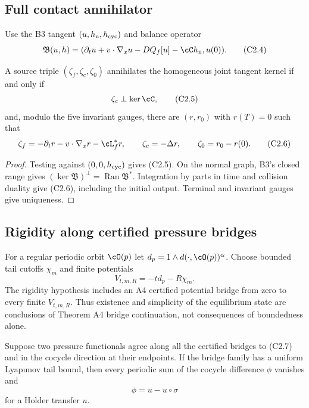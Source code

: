 \subsection{Full contact annihilator}

Use the B3 tangent $(u,h_{\rm n},h_{\rm cyc})$ and balance operator
\[
 \mathfrak B(u,h)=
 (\partial_tu+v\cdot\nabla_xu-DQ_f[u]-\cC h_{\rm n},u(0)).              \tag{C2.4}
\]

\begin{theorem}
\label{thm:r31-c2-annihilator}
A source triple $(\zeta_f,\zeta_c,\zeta_0)$ annihilates the homogeneous joint
tangent kernel if and only if
\[
 \zeta_c\perp\ker\cC,                                    \tag{C2.5}
\]
and, modulo the five invariant gauges, there are $(r,r_0)$ with $r(T)=0$
such that
\[
 \zeta_f=-\partial_tr-v\cdot\nabla_xr-\cL_f^*r,\qquad
 \zeta_c=-\Delta r,\qquad
 \zeta_0=r_0-r(0).                                       \tag{C2.6}
\]
\end{theorem}

\begin{proof}
Testing against $(0,0,h_{\rm cyc})$ gives (C2.5).  On the normal graph, B3's
closed range gives
$(\ker\mathfrak B)^\perp=\operatorname{Ran}\mathfrak B^*$.
Integration by parts in time and collision duality give (C2.6), including the
initial output.  Terminal and invariant gauges give uniqueness.
\end{proof}

\subsection{Rigidity along certified pressure bridges}

For a regular periodic orbit $\cO(p)$ let
$d_p=1\wedge d(\cdot,\cO(p))^\alpha$.  Choose bounded tail cutoffs $\chi_m$
and finite potentials
\[
 V_{t,m,R}=-t d_p-R\chi_m.                                \tag{C2.7}
\]
The rigidity hypothesis includes an A4 certified potential bridge from zero
to every finite $V_{t,m,R}$.  Thus existence and simplicity of the equilibrium
state are conclusions of Theorem A4 bridge continuation, not consequences of
boundedness alone.

\begin{theorem}
\label{thm:r31-c2-rigidity}
Suppose two pressure functionals agree along all the certified bridges to
(C2.7) and in the cocycle direction at their endpoints.  If the bridge family
has a uniform Lyapunov tail bound, then every periodic sum of the cocycle
difference $\phi$ vanishes and
\[
 \phi=u-u\circ\sigma                                     \tag{C2.8}
\]
for a Holder transfer $u$.
\end{theorem}

